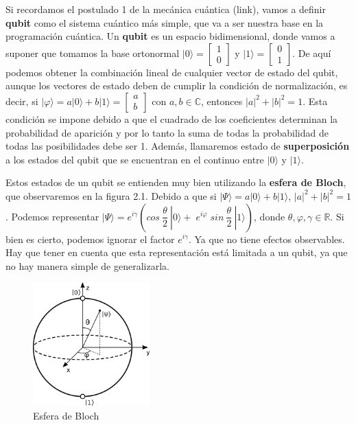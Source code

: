  Si recordamos el postulado 1 de la mecánica cuántica (link), vamos a definir \textbf{qubit} como el sistema cuántico más simple, que va a ser nuestra base en la programación cuántica. Un \textbf{qubit} es un espacio bidimensional, donde vamos a suponer que tomamos la base ortonormal $|0 \rangle = \begin{bmatrix} 1\\0 \end{bmatrix}$ y $|1 \rangle = \begin{bmatrix} 0\\1 \end{bmatrix}$. De aquí podemos obtener la combinación lineal de cualquier vector de estado del qubit, aunque los vectores de estado deben de cumplir la condición de normalización, es decir, si $|\varphi \rangle = a |0\rangle + b |1\rangle = \begin{bmatrix} a\\b \end{bmatrix}$ con $a,b \in \mathbb{C}$, entonces $|a|^{2}+|b|^{2}=1$. Esta condición se impone debido a que el cuadrado de los coeficientes determinan la probabilidad de aparición y por lo tanto la suma de todas la probabilidad de todas las posibilidades debe ser 1. Además, llamaremos estado de \textbf{superposición} a los estados del qubit que se encuentran en el continuo entre $|0\rangle$ y $|1\rangle$.\newline

 Estos estados de un qubit se entienden muy bien utilizando la \textbf{esfera de Bloch}, que observaremos en la figura 2.1. Debido a que si $|\Psi \rangle = a |0\rangle + b |1\rangle$, $|a|^{2}+|b|^{2}=1$. Podemos representar $|\Psi \rangle = e^{i\gamma}\left( cos\:\dfrac{\theta}{2} \:|0\rangle +\; e^{i\varphi}\;sin\:\dfrac{\theta}{2}\:|1\rangle\right)$, donde $\theta,\varphi,\gamma \in \mathbb{R}$. Si bien es cierto, podemos ignorar el factor $e^{i\gamma}$. Ya que no tiene efectos observables. Hay que tener en cuenta que esta representación está limitada a un qubit, ya que no hay manera simple de generalizarla.

  \begin{figure}[H]
    \centering
    \includegraphics[width=0.4\textwidth]{TFG/imagenes/Bloch_sphere.png}
    \caption{Esfera de Bloch} 
  \end{figure}
 

